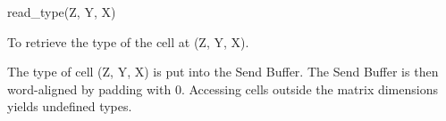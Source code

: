 

\format
read\_type(Z, Y, X)

\purpose

To retrieve the type of the cell at (Z, Y, X).

\description

The type of cell (Z, Y, X) is put into the Send Buffer.
The Send Buffer is then word-aligned by padding with 0.
Accessing cells outside the matrix dimensions yields undefined types.
